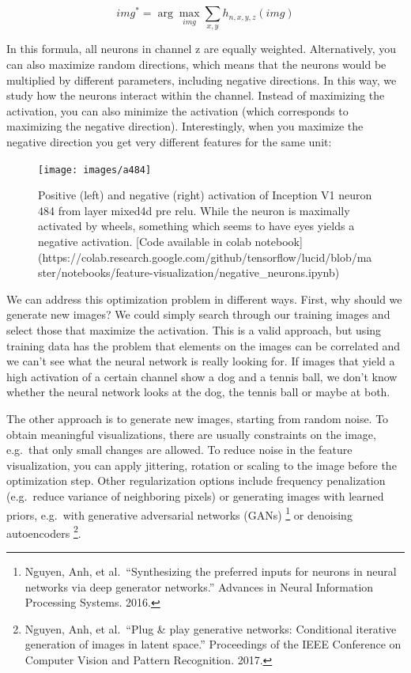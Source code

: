 \documentclass[
  12pt,
]{krantz}
\begin{document}
\[img^*=\arg\max_{img}\sum_{x,y}h_{n,x,y,z}(img)\]

In this formula, all neurons in channel z are equally weighted.
Alternatively, you can also maximize random directions, which means that the neurons would be multiplied by different parameters, including negative directions.
In this way, we study how the neurons interact within the channel.
Instead of maximizing the activation, you can also minimize the activation (which corresponds to maximizing the negative direction).
Interestingly, when you maximize the negative direction you get very different features for the same unit:

\begin{figure}

{\centering \texttt{[image: images/a484]} 

}

\caption{Positive (left) and negative (right) activation of Inception V1 neuron 484 from layer mixed4d pre relu. While the neuron is maximally activated by wheels, something which seems to have eyes yields a negative activation. [Code available in colab notebook](https://colab.research.google.com/github/tensorflow/lucid/blob/master/notebooks/feature-visualization/negative\_neurons.ipynb)}\label{fig:pos-neg}
\end{figure}

We can address this optimization problem in different ways.
First, why should we generate new images?
We could simply search through our training images and select those that maximize the activation.
This is a valid approach, but using training data has the problem that elements on the images can be correlated and we can't see what the neural network is really looking for.
If images that yield a high activation of a certain channel show a dog and a tennis ball, we don't know whether the neural network looks at the dog, the tennis ball or maybe at both.

The other approach is to generate new images, starting from random noise.
To obtain meaningful visualizations, there are usually constraints on the image, e.g.~that only small changes are allowed.
To reduce noise in the feature visualization, you can apply jittering, rotation or scaling to the image before the optimization step.
Other regularization options include frequency penalization (e.g.~reduce variance of neighboring pixels) or generating images with learned priors, e.g.~with generative adversarial networks (GANs) \footnote{Nguyen, Anh, et al.~``Synthesizing the preferred inputs for neurons in neural networks via deep generator networks.'' Advances in Neural Information Processing Systems. 2016.} or denoising autoencoders \footnote{Nguyen, Anh, et al.~``Plug \& play generative networks: Conditional iterative generation of images in latent space.'' Proceedings of the IEEE Conference on Computer Vision and Pattern Recognition. 2017.}.
\end{document}
